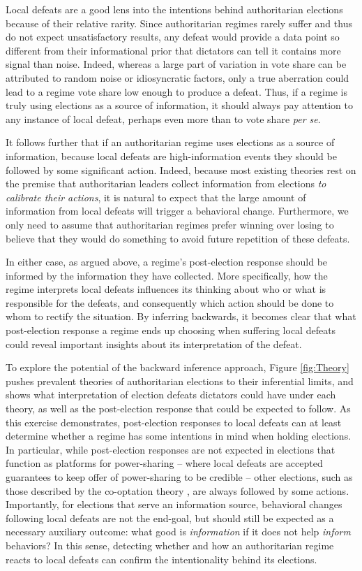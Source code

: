\documentclass[12pt]{article}
\newcommand{\1}{\mathbbm{1}}
\begin{document}
Local defeats are a good lens into the intentions behind authoritarian elections because of their relative rarity. Since authoritarian regimes rarely suffer and thus do not expect unsatisfactory results, any defeat would provide a data point so different from their informational prior that dictators can tell it contains more signal than noise. Indeed, whereas a large part of variation in vote share can be attributed to random noise or idiosyncratic factors, only a true aberration could lead to a regime vote share low enough to produce a defeat. Thus, if a regime is truly using elections as a source of information, it should always pay attention to any instance of local defeat, perhaps even more than to vote share \textit{per se}.

It follows further that if an authoritarian regime uses elections as a source of information, because local defeats are high-information events they should be followed by some significant action. Indeed, because most existing theories rest on the premise that authoritarian leaders collect information from elections \textit{to calibrate their actions}, it is natural to expect that the large amount of information from local defeats will trigger a behavioral change. Furthermore, we only need to assume that authoritarian regimes prefer winning over losing to believe that they would do something to avoid future repetition of these defeats. 

In either case, as argued above, a regime's post-election response should be informed by the information they have collected. More specifically, how the regime interprets local defeats influences its thinking about who or what is responsible for the defeats, and consequently which action should be done to whom to rectify the situation. By inferring backwards, it becomes clear that what post-election response a regime ends up choosing when suffering local defeats could reveal important insights about its interpretation of the defeat.

To explore the potential of the backward inference approach, Figure \ref{fig:Theory} pushes prevalent theories of authoritarian elections to their inferential limits, and shows what interpretation of election defeats dictators could have under each theory, as well as the post-election response that could be expected to follow. As this exercise demonstrates, post-election responses to local defeats can at least determine whether a regime has some intentions in mind when holding elections. In particular, while post-election responses are not expected in elections that function as platforms for power-sharing -- where local defeats are accepted guarantees to keep offer of power-sharing to be credible \citep{AR2005, Cox2009} -- other elections, such as those described by the co-optation theory \citep{LustOkar2005}, are always followed by some actions. Importantly, for elections that serve an information source, behavioral changes following local defeats are not the end-goal, but should still be expected as a necessary auxiliary outcome: what good is \textit{information} if it does not help \textit{inform} behaviors? In this sense, detecting whether and how an authoritarian regime reacts to local defeats can confirm the intentionality behind its elections.
\end{document}

